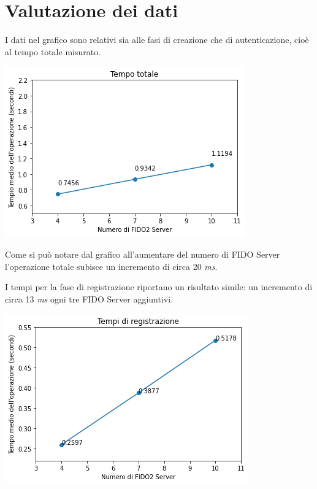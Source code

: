 \section{Valutazione dei dati}
\label{valutazione}

I dati nel grafico sono relativi sia alle fasi di creazione che di autenticazione, cioè al tempo totale misurato.
\begin{center}
	\includegraphics[scale=0.65]{figures/test_results}
\end{center}

Come si può notare dal grafico all'aumentare del numero di FIDO Server l'operazione totale subisce un incremento di circa 20 \emph{ms}. 

I tempi per la fase di registrazione riportano un risultato simile: un incremento di circa 13 \emph{ms} ogni tre FIDO Server aggiuntivi.
\begin{center}
	\includegraphics[scale=0.65]{figures/creation_results}
\end{center}

